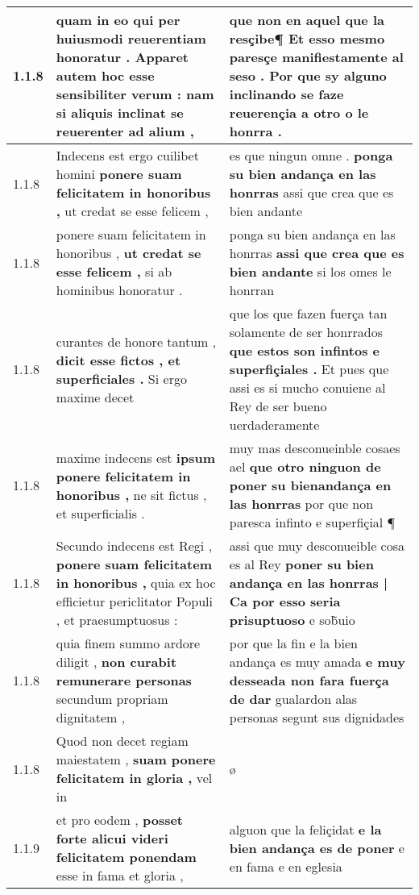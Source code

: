 \begin{tabular}{|p{1cm}|p{6.5cm}|p{6.5cm}|}
1.1.8 & quam in eo qui per huiusmodi reuerentiam honoratur . \textbf{ Apparet autem hoc esse sensibiliter verum : } nam si aliquis inclinat se reuerenter ad alium , & que non en aquel que la resçibe¶ \textbf{ Et esso mesmo paresçe manifiestamente al seso . } Por que sy alguno inclinando se faze reuerençia a otro o le honrra . \\\hline
1.1.8 & Indecens est ergo cuilibet homini \textbf{ ponere suam felicitatem in honoribus , } ut credat se esse felicem , & es que ningun omne . \textbf{ ponga su bien andança en las honrras } assi que crea que es bien andante \\\hline
1.1.8 & ponere suam felicitatem in honoribus , \textbf{ ut credat se esse felicem , } si ab hominibus honoratur . & ponga su bien andança en las honrras \textbf{ assi que crea que es bien andante } si los omes le honrran \\\hline
1.1.8 & curantes de honore tantum , \textbf{ dicit esse fictos , et superficiales . } Si ergo maxime decet & que los que fazen fuerça tan solamente de ser honrrados \textbf{ que estos son infintos e superfiçiales . } Et pues que assi es si mucho conuiene al Rey de ser bueno uerdaderamente \\\hline
1.1.8 & maxime indecens est \textbf{ ipsum ponere felicitatem in honoribus , } ne sit fictus , et superficialis . & muy mas desconueinble cosaes ael \textbf{ que otro ninguon de poner su bienandança en las honrras } por que non paresca infinto e superfiçial ¶ \\\hline
1.1.8 & Secundo indecens est Regi , \textbf{ ponere suam felicitatem in honoribus , } quia ex hoc efficietur periclitator Populi , et praesumptuosus : & assi que muy desconueible cosa es al Rey \textbf{ poner su bien andança en las honrras | Ca por esso seria prisuptuoso } e sob̃uio \\\hline
1.1.8 & quia finem summo ardore diligit , \textbf{ non curabit remunerare personas } secundum propriam dignitatem , & por que la fin e la bien andança es muy amada \textbf{ e muy desseada non fara fuerça de dar } gualardon alas personas segunt sus dignidades \\\hline
1.1.8 & Quod non decet regiam maiestatem , \textbf{ suam ponere felicitatem in gloria , } vel in & ø \\\hline
1.1.9 & et pro eodem , \textbf{ posset forte alicui videri felicitatem ponendam } esse in fama et gloria , & alguon que la feliçidat \textbf{ e la bien andança es de poner } e en fama e en eglesia \\\hline

\end{tabular}

